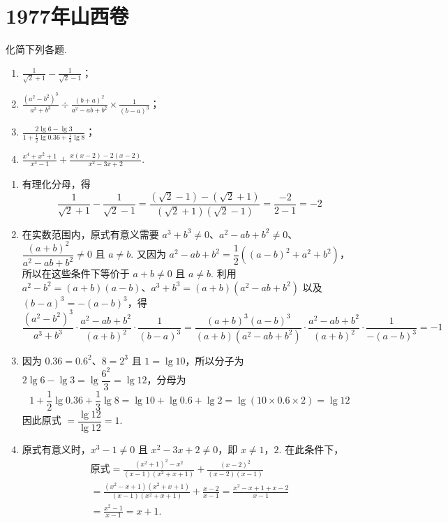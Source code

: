 \chapter{1977年山西卷}

\begin{problem}
化简下列各题.

\begin{enumerate}
\item \( \frac{1}{\sqrt{2}+1}-\frac{1}{\sqrt{2}-1} \)；

\item \( \frac{(a^2-b^2)^3}{a^3+b^3}\div\frac{(b+a)^2}{a^2-ab+b^2}\times\frac{1}{(b-a)^3} \)；

\item \( \frac{2\lg 6-\lg 3}{1+\frac{1}{2}\lg 0.36+\frac{1}{3}\lg 8} \)；

\item \( \frac{x^4+x^2+1}{x^3-1}+\frac{x(x-2)-2(x-2)}{x^2-3x+2} \).
\end{enumerate}
\end{problem}

\begin{solution}
\begin{enumerate}
\item 有理化分母，得
\[
\frac{1}{\sqrt{2}+1}-\frac{1}{\sqrt{2}-1}
=\frac{\left(\sqrt{2}-1\right)-\left(\sqrt{2}+1\right)}{\left(\sqrt{2}+1\right)\left(\sqrt{2}-1\right)}
=\frac{-2}{2-1}=-2
\]

\item 在实数范围内，原式有意义需要 \(a^3+b^3\ne0\)、\(a^2-ab+b^2\ne0\)、\(\dfrac{(a+b)^2}{a^2-ab+b^2}\ne0\) 且 \(a\ne b\). 又因为 \(a^2-ab+b^2=\dfrac{1}{2}\left((a-b)^2+a^2+b^2\right)\)，所以在这些条件下等价于 \(a+b\ne0\) 且 \(a\ne b\). 利用 \(a^2-b^2=(a+b)(a-b)\)、\(a^3+b^3=(a+b)(a^2-ab+b^2)\) 以及 \((b-a)^3=-(a-b)^3\)，得
\[
\frac{(a^2-b^2)^3}{a^3+b^3}\cdot\frac{a^2-ab+b^2}{(a+b)^2}\cdot\frac{1}{(b-a)^3}
=\frac{(a+b)^3(a-b)^3}{(a+b)(a^2-ab+b^2)}\cdot\frac{a^2-ab+b^2}{(a+b)^2}\cdot\frac{1}{-(a-b)^3}=-1
\]

\item 因为 \(0.36=0.6^2\)、\(8=2^3\) 且 \(1=\lg 10\)，所以分子为 \(2\lg6-\lg3=\lg\dfrac{6^2}{3}=\lg12\)，分母为
\[
1+\frac{1}{2}\lg0.36+\frac{1}{3}\lg8
=\lg10+\lg0.6+\lg2
=\lg\left(10\times0.6\times2\right)=\lg12
\]
因此原式 \(=\dfrac{\lg12}{\lg12}=1\).

\item 原式有意义时，\(x^3-1\ne0\) 且 \(x^2-3x+2\ne0\)，即 \(x\ne1\)，\(2\). 在此条件下，
\[
\begin{gathered}
\text{原式}=\frac{(x^2+1)^2-x^2}{(x-1)(x^2+x+1)}+\frac{(x-2)^2}{(x-2)(x-1)}\\
=\frac{(x^2-x+1)(x^2+x+1)}{(x-1)(x^2+x+1)}+\frac{x-2}{x-1}
=\frac{x^2-x+1+x-2}{x-1}\\
=\frac{x^2-1}{x-1}=x+1.
\end{gathered}
\]
\end{enumerate}
\end{solution}


